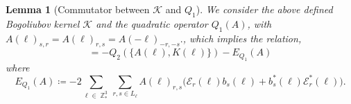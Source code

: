 \documentclass[sn-mathphys, Numbered ,a4paper]{sn-jnl}%
\DeclareMathOperator{\Z}{\mathbb{Z}}
\theoremstyle{plain}
\newtheorem{lemma}[theorem]{Lemma}
\theoremstyle{definition}
\theoremstyle{remark}
\theoremstyle{plain}
\theoremstyle{definition}
\theoremstyle{remark}
\begin{document}
\begin{lemma}[Commutator between $\mathcal{K} $ and $Q_1$]\label{lem:Q1Kcomm}
 We consider the above defined Bogoliubov kernel $\mathcal{K}$ and the quadratic operator $Q_1(A)$, with $A(\ell)_{s,r} = A(\ell)_{r,s} = A(-\ell)_{-r,-s}.$, which implies the relation,
    \begin{equation}
        [ Q_1(A),\mathcal{K}] = -Q_2(\{A(\ell),K(\ell)\}) - E_{Q_1}(A)
    \end{equation}
 where
 \begin{equation}\label{eq:errKQ1}
     E_{Q_1}(A)\coloneq- 2 \sum\limits_{\ell \in \Z^3_*}\sum\limits_{r,s \in L_{\ell}}A(\ell)_{r,s}\Big(\mathcal{E}_{r}(\ell)b_{s}(\ell) + b^*_{s}(\ell)\mathcal{E}^*_{r}(\ell)\Big). 
 \end{equation}
\end{lemma}
\end{document}
